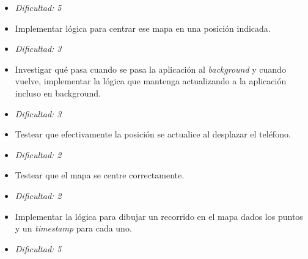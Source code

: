 \documentclass[10pt, a4paper,english,spanish]{article}
\begin{document}
\begin{itemize}
	\item[] \hfill \textit{Dificultad: 5}
	\item Implementar lógica para centrar ese mapa en una posición indicada.
	\item[] \hfill \textit{Dificultad: 3}
	\item Investigar qué pasa cuando se pasa la aplicación al \textit{background} y cuando vuelve, 
			implementar la lógica que mantenga actualizando a la aplicación incluso en background.
	\item[] \hfill \textit{Dificultad: 3}
	\item Testear que efectivamente la posición se actualice al desplazar el teléfono.
	\item[] \hfill \textit{Dificultad: 2}
	\item Testear que el mapa se centre correctamente.
	\item[] \hfill \textit{Dificultad: 2}
	\item Implementar la lógica para dibujar un recorrido en el mapa dados los puntos y un \textit{timestamp} para cada uno.
	\item[] \hfill \textit{Dificultad: 5}
\end{itemize}
\end{document}
